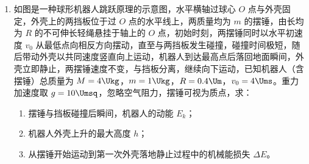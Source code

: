 \documentclass[\gkver]{gaokaozhenti}
\begin{document}
\begin{enumerate}
{根据题意有 $V_{1}=10\pi r^{2}\cdot h$。

解得充气后未挤压变形时气室中的压强 $p_{1}=\frac{p_{0}V_{0}}{10\pi hr^{2}}$。

（2）变形前，气室的体积为 $V=\pi r^{2}h$。

挤压过程温度不变，且横截面周长不变，原圆形横截面周长 $C=2\pi r$。

变形后跑道形横截面两端半圆合为一个整圆，周长为 $C_{1}=\pi d$。

剩余直边总长度为 $C_{2}=C-C_{1}=2\pi r-\pi d$。

单根直边长 $x=\frac{C_{2}}{2}=\pi r-\frac{\pi d}{2}$。

变形后，气室的体积为 $V_{2}=\left[\pi\left(\frac{d}{2}\right)^{2}+xd\right]\cdot h$。

对气室气体，等温过程由玻意耳定律 $p_{1}V=p_{2}V_{2}$。

解得挤压变形后气室中的压强 $p_{2}=\frac{2p_{0}V_{0}}{5\pi dh(4r-d)}$。

（3）体积不变，气体等容变化，有 $\frac{p_{2}}{T_{0}}=\frac{p_{c}}{T_{c}}$。

解得气室不爆破的最高室温 $T_{c}=\frac{5\pi dh(4r-d)p_{c}T_{0}}{2p_{0}V_{0}}$。
}

\item
如图是一种球形机器人跳跃原理的示意图，水平横轴过球心 $O$ 点与外壳固定，外壳上的两挡板位于过 $O$ 点的水平线上，两质量均为 $m$ 的摆锤，由长均为 $R$ 的不可伸长轻绳悬挂于轴上的 $O$ 点，初始时刻，两摆锤同时以水平初速度 $v_{0}$ 从最低点向相反方向摆动，直至与两挡板发生碰撞，碰撞时间极短，随后带动外壳以共同速度竖直向上运动，机器人到达最高点后落回地面瞬间，外壳立即静止，两摆锤速度不变，与挡板分离，继续向下运动，已知机器人（含摆锤）总质量为 $M=4\Ukg$，$m=1\Ukg$，$R=0.4\Um$，$v_{0}=4\Ums$。重力加速度取 $g=10\Umsq$，忽略空气阻力，摆锤可视为质点，求：
\begin{enumerate}
	\item
	摆锤与挡板碰撞后瞬间，机器人的动能 $E_{k}$；
	\item
	机器人外壳上升的最大高度 $h$；
	\item
	从摆锤开始运动到第一次外壳落地静止过程中的机械能损失 $\Delta E$。
\end{enumerate}

\end{enumerate}
\end{document}
